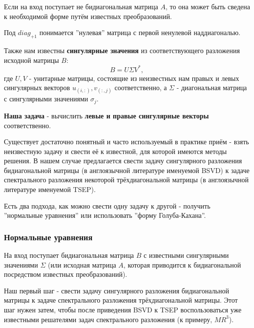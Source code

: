 \begin{note}
    Если на вход поступает не бидиагональная матрица \(A\), то она может быть сведена к необходимой форме путём известных преобразований.
\end{note}

\begin{note}
    Под \(diag_{+1}\) понимается ''нулевая'' матрица с первой ненулевой наддиагональю.
\end{note}

Также нам известны \textbf{сингулярные значения} из соответствующего разложения исходной матрицы \(B\):
\begin{equation}
        B=U \Sigma V^*,
\end{equation}
где $U,V$ - унитарные матрицы, состоящие из неизвестных нам правых и левых сингулярных векторов $u_{(i,:)},v_{(:,j)}$ соответственно, а $\Sigma$ - диагональная матрица с сингулярными значениями \(\sigma_j\).

\textbf{Наша задача} - вычислить \textbf{левые и правые сингулярные векторы} соответственно.

Существует достаточно понятный и часто используемый в практике приём - взять неизвестную задачу и свести её к известной, для которой имеются методы решения. В нашем случае предлагается свести задачу сингулярного разложения бидиагональной матрицы (в англоязычной литературе именуемой BSVD) к задаче спектрального разложения некоторой трёхдиагональной матрицы (в англоязычной литературе именуемой TSEP).

Есть два подхода, как можно свести одну задачу к другой - получить ''нормальные уравнения'' или использовать ''форму Голуба-Кахана''.



\subsubsection{Нормальные уравнения}

На вход поступает бидиагональная матрица $B$ с известными сингулярными значениями $\Sigma$ (или исходная матрица $A$, которая приводится к бидиагональной посредством известных преобразований).

Наш первый шаг - свести задачу сингулярного разложения бидиагональной матрицы к задаче спектрального разложения трёхдиагональной матрицы. Этот шаг нужен затем, чтобы после приведения BSVD к TSEP воспользоваться уже известными решателями задач спектрального разложения (к примеру, $MR^3$).

